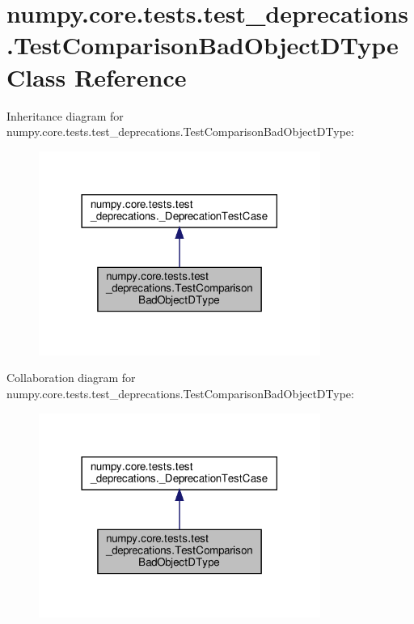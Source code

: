 \hypertarget{classnumpy_1_1core_1_1tests_1_1test__deprecations_1_1TestComparisonBadObjectDType}{}\section{numpy.\+core.\+tests.\+test\+\_\+deprecations.\+Test\+Comparison\+Bad\+Object\+D\+Type Class Reference}
\label{classnumpy_1_1core_1_1tests_1_1test__deprecations_1_1TestComparisonBadObjectDType}


Inheritance diagram for numpy.\+core.\+tests.\+test\+\_\+deprecations.\+Test\+Comparison\+Bad\+Object\+D\+Type\+:
\nopagebreak
\begin{figure}[H]
\begin{center}
\leavevmode
\includegraphics[width=261pt]{classnumpy_1_1core_1_1tests_1_1test__deprecations_1_1TestComparisonBadObjectDType__inherit__graph}
\end{center}
\end{figure}


Collaboration diagram for numpy.\+core.\+tests.\+test\+\_\+deprecations.\+Test\+Comparison\+Bad\+Object\+D\+Type\+:
\nopagebreak
\begin{figure}[H]
\begin{center}
\leavevmode
\includegraphics[width=261pt]{classnumpy_1_1core_1_1tests_1_1test__deprecations_1_1TestComparisonBadObjectDType__coll__graph}
\end{center}
\end{figure}
